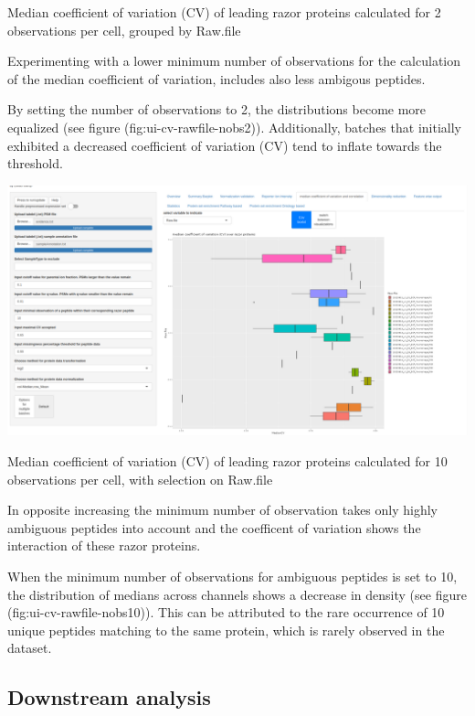 \documentclass[
  11pt,
]{article}
\let\origfigure\figure
\begin{document}
\caption{Median coefficient of variation (CV) of leading razor proteins calculated for 2  observations per cell, grouped by Raw.file}\label{fig:ui-cv-rawfile-nobs2}
 \endfigure\egroup

Experimenting with a lower minimum number of observations for the calculation of the median coefficient of variation, includes also less ambigous peptides.

By setting the number of observations to 2, the distributions become more equalized (see figure (fig:ui-cv-rawfile-nobs2)). Additionally, batches that initially exhibited a decreased coefficient of variation (CV) tend to inflate towards the threshold.

\newpage
\bgroup  \origfigure[H] 

{\centering \includegraphics[width=1\linewidth]{screenshots/cv_rawfile_nobs10} 

}

\caption{Median coefficient of variation (CV) of leading razor proteins calculated for 10 observations per cell, with selection on Raw.file}\label{fig:ui-cv-rawfile-nobs10}
 \endfigure\egroup

In opposite increasing the minimum number of observation takes only highly ambiguous peptides into account and the coefficent of variation shows the interaction of these razor proteins.

When the minimum number of observations for ambiguous peptides is set to 10, the distribution of medians across channels shows a decrease in density (see figure (fig:ui-cv-rawfile-nobs10)). This can be attributed to the rare occurrence of 10 unique peptides matching to the same protein, which is rarely observed in the dataset.

\newpage

\hypertarget{downstream-analysis-1}{%
\subsection{Downstream analysis}\label{downstream-analysis-1}}
\end{document}

